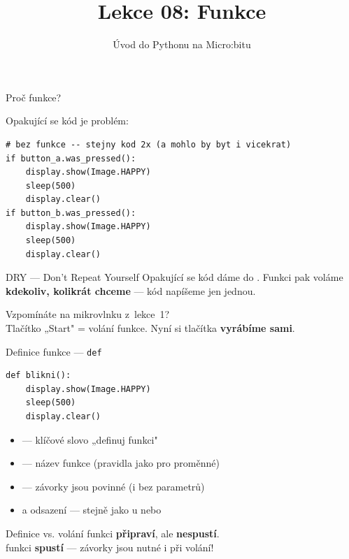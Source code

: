 

\title{Lekce 08: Funkce}
\subtitle{Úvod do Pythonu na Micro:bitu}
\date{}



\begin{frame}
  \titlepage
\end{frame}

\begin{frame}[fragile]{Proč funkce?}

  Opakující se kód je problém:

  \bigskip
  \begin{lstlisting}
# bez funkce -- stejny kod 2x (a mohlo by byt i vicekrat)
if button_a.was_pressed():
    display.show(Image.HAPPY)
    sleep(500)
    display.clear()
if button_b.was_pressed():
    display.show(Image.HAPPY)
    sleep(500)
    display.clear()
  \end{lstlisting}

  \pause\bigskip
  \begin{block}{DRY — Don't Repeat Yourself}
    Opakující se kód dáme do .
    Funkci pak voláme \textbf{kdekoliv, kolikrát chceme} — kód napíšeme jen jednou.
  \end{block}

  \bigskip
  Vzpomínáte na mikrovlnku z~lekce~1?\\
  Tlačítko „Start" = volání funkce. Nyní si tlačítka \textbf{vyrábíme sami}.
\end{frame}

\begin{frame}[fragile]{Definice funkce — \texttt{def}}

  \begin{lstlisting}
def blikni():
    display.show(Image.HAPPY)
    sleep(500)
    display.clear()
  \end{lstlisting}

  \bigskip
  \begin{itemize}
    \item {} — klíčové slovo „definuj funkci"
    \item {} — název funkce (pravidla jako pro proměnné)
    \item \pyinline{()} — závorky jsou povinné (i bez parametrů)
    \item \pyinline{:} a odsazení — stejně jako u  nebo 
  \end{itemize}

  \pause\bigskip
  \begin{alertblock}{Definice vs. volání}
     funkci \textbf{připraví}, ale \textbf{nespustí}.\\
     funkci \textbf{spustí} — závorky jsou nutné i při volání!
  \end{alertblock}
\end{frame}

